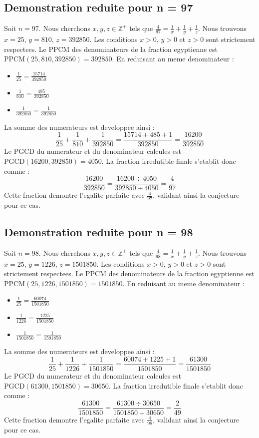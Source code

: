 \documentclass[11pt,a4paper]{article}
\begin{document}
\subsection{Demonstration reduite pour n = 97}
Soit $n = 97$. Nous cherchons $x, y, z \in \mathbb{Z}^{+}$ tels que $\frac{4}{97} = \frac{1}{x} + \frac{1}{y} + \frac{1}{z}$.
Nous trouvons $x = 25$, $y = 810$, $z = 392850$.
Les conditions $x > 0$, $y > 0$ et $z > 0$ sont strictement respectees.
Le PPCM des denominateurs de la fraction egyptienne est $\text{PPCM}(25, 810, 392850) = 392850$.
En reduisant au meme denominateur :
\begin{itemize}
    \item $\frac{1}{25} = \frac{15714}{392850}$
    \item $\frac{1}{810} = \frac{485}{392850}$
    \item $\frac{1}{392850} = \frac{1}{392850}$
\end{itemize}
La somme des numerateurs est developpee ainsi :
$$ \frac{1}{25} + \frac{1}{810} + \frac{1}{392850} = \frac{15714 + 485 + 1}{392850} = \frac{16200}{392850} $$
Le PGCD du numerateur et du denominateur calcules est $\text{PGCD}(16200, 392850) = 4050$.
La fraction irredutible finale s'etablit donc comme :
$$ \frac{16200}{392850} = \frac{16200 \div 4050}{392850 \div 4050} = \frac{4}{97} $$
Cette fraction demontre l'egalite parfaite avec $\frac{4}{97}$, validant ainsi la conjecture pour ce cas.

\subsection{Demonstration reduite pour n = 98}
Soit $n = 98$. Nous cherchons $x, y, z \in \mathbb{Z}^{+}$ tels que $\frac{4}{98} = \frac{1}{x} + \frac{1}{y} + \frac{1}{z}$.
Nous trouvons $x = 25$, $y = 1226$, $z = 1501850$.
Les conditions $x > 0$, $y > 0$ et $z > 0$ sont strictement respectees.
Le PPCM des denominateurs de la fraction egyptienne est $\text{PPCM}(25, 1226, 1501850) = 1501850$.
En reduisant au meme denominateur :
\begin{itemize}
    \item $\frac{1}{25} = \frac{60074}{1501850}$
    \item $\frac{1}{1226} = \frac{1225}{1501850}$
    \item $\frac{1}{1501850} = \frac{1}{1501850}$
\end{itemize}
La somme des numerateurs est developpee ainsi :
$$ \frac{1}{25} + \frac{1}{1226} + \frac{1}{1501850} = \frac{60074 + 1225 + 1}{1501850} = \frac{61300}{1501850} $$
Le PGCD du numerateur et du denominateur calcules est $\text{PGCD}(61300, 1501850) = 30650$.
La fraction irredutible finale s'etablit donc comme :
$$ \frac{61300}{1501850} = \frac{61300 \div 30650}{1501850 \div 30650} = \frac{2}{49} $$
Cette fraction demontre l'egalite parfaite avec $\frac{4}{98}$, validant ainsi la conjecture pour ce cas.
\end{document}
